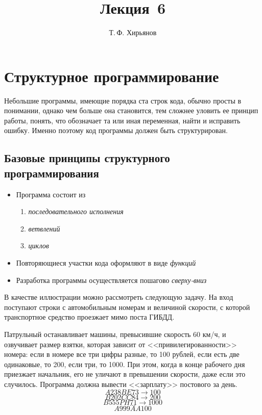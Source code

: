 \documentclass[a4paper, fleqn]{article}
\title{Лекция \textnumero\,6}
\author{Т.\,Ф. Хирьянов}
\date{}
\begin{document}
	\maketitle
	
	\section*{Структурное программирование}
	
	Небольшие программы, имеющие порядка ста строк кода, обычно просты в понимании, однако чем больше она становится, тем сложнее уловить ее принцип работы, понять, что обозначает та или иная переменная, найти и исправить ошибку. Именно поэтому код программы должен быть структурирован.
	
	\subsection*{Базовые принципы структурного программирования}
	
	\begin{itemize}
		\item Программа состоит из 
		\begin{enumerate}
			\item \emph{последовательного исполнения}
			\item \emph{ветвлений}
			\item \emph{циклов}
		\end{enumerate}
		\item Повторяющиеся участки кода оформляют в виде \emph{функций}
		\item Разработка программы осуществляется пошагово \emph{сверху-вниз}
	\end{itemize}
	
	В качестве иллюстрации можно рассмотреть следующую задачу. На вход поступают строки с автомобильным номерам и величиной скорости, с которой транспортное средство проезжает мимо поста ГИБДД. 
	
	Патрульный останавливает машины, превысившие скорость 60 км/ч, и озвучивает размер взятки, которая зависит от <<привилегированности>> номера: если в номере все три цифры разные, то 100 рублей, если есть две одинаковые, то 200, если три, то 1000. При этом, когда в конце рабочего дня приезжает начальник, его не уличают в превышении скорости, даже если это случилось. Программа должна вывести <<зарплату>> постового за день. 
	\[A238BE	73	\longrightarrow 100\]
	\[B202CC	84	\longrightarrow	200\]
	\[B555PH	71	\longrightarrow	1000\]
	\[...\]
	\[A999AA	100\]
	
\end{document}
